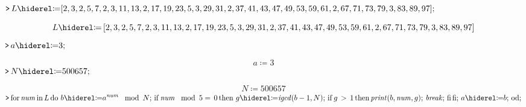 \documentclass{article}
\begin{document}
\lstset{basicstyle=\ttfamily,breaklines=true,columns=flexible}
\pagestyle{empty}
\mapleinput
{$ \displaystyle \texttt{>\,} L \coloneqq [2,3,2,5,7,2,3,11,13,2,17,19,23,5,3,29,31,2,37,41,43,47,49,53,59,61,2,67,71,73,79,3,83,89,97]; $}

\begin{dmath}\label{(1)}
L \coloneqq 
\\
\left[2,3,2,5,7,2,3,11,13,2,17,19,23,5,3,29,31,2,37,41,43,
\\
47,49,53,59,61,2,67,71,73,79,3,83,89,97\right]
\end{dmath}
\mapleinput
{$ \displaystyle \texttt{>\,} a \coloneqq 3; $}

\begin{dmath}\label{(2)}
a \coloneqq 3
\end{dmath}
\mapleinput
{$ \displaystyle \texttt{>\,} N \coloneqq 500657; $}

\begin{dmath}\label{(3)}
N \coloneqq 500657
\end{dmath}
\mapleinput
{$ \displaystyle \texttt{>\,} \mathrm{for}\,\mathit{num} \,\mathrm{in}\,L \,\mathrm{do}\, \,b \coloneqq a^{\mathit{num}}\,\mod \,N ;
\\
 \,\mathrm{if}\,\mathit{num} \,\mod \,5=\,0\,\mathrm{then}\, \,g \coloneqq \mathit{igcd} (b -1,N);
\\
 \,\mathrm{if}\,g \,>\,1\,\mathrm{then} \,\mathit{print} (b ,\mathit{num} ,g);
\\
 \,\mathit{break} ;
\\
 \,\mathrm{fi} \,\mathrm{fi};
\\
 \,a \coloneqq b ;
\\
 \,\mathrm{od}; $}
\end{document}
